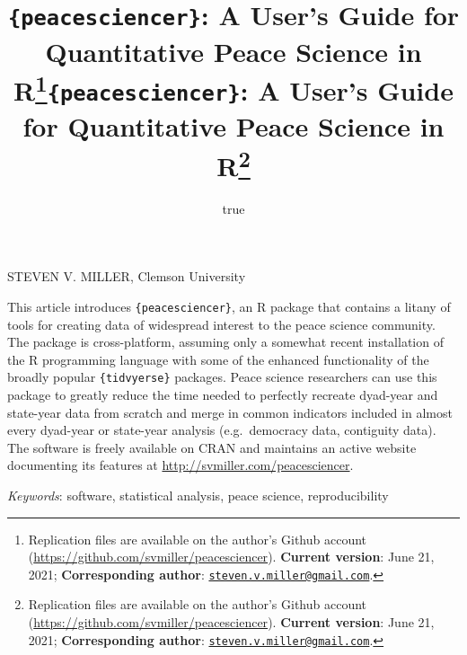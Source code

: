 \documentclass[
  11pt,
]{article}
\title{\texttt{\{peacesciencer\}}: A User's Guide for Quantitative Peace Science in R\thanks{Replication files are available on the author's Github account (\url{https://github.com/svmiller/peacesciencer}). \textbf{Current version}: June 21, 2021; \textbf{Corresponding author}: \href{mailto:steven.v.miller@gmail.com}{\nolinkurl{steven.v.miller@gmail.com}}.}}
\author{true}
\date{}
\title{\texttt{\{peacesciencer\}}: A User's Guide for Quantitative Peace Science in R\thanks{Replication files are available on the author's Github account (\url{https://github.com/svmiller/peacesciencer}). \textbf{Current version}: June 21, 2021; \textbf{Corresponding author}: \href{mailto:steven.v.miller@gmail.com}{\nolinkurl{steven.v.miller@gmail.com}}.}  }
\date{}
\renewenvironment{abstract}
 {{%
    \setlength{\leftmargin}{0mm}
    \setlength{\rightmargin}{\leftmargin}%
  }%
  \relax}
 {\endlist}
\begin{document}



{%
\setlength{\parindent}{0pt}
\thispagestyle{plain}
{%
\maketitle  %

}




{
   \vskip 13.5pt\relax \normalsize\fontsize{11}{12}
   \MakeUppercase{Steven V. Miller}, \small{Clemson University}   

}

}








\begin{abstract}


    \vskip 8.5pt %

\noindent \small{This article introduces \texttt{\{peacesciencer\}}, an R package that contains a litany of tools for creating data of widespread interest to the peace science community. The package is cross-platform, assuming only a somewhat recent installation of the R programming language with some of the enhanced functionality of the broadly popular \texttt{\{tidvyerse\}} packages. Peace science researchers can use this package to greatly reduce the time needed to perfectly recreate dyad-year and state-year data from scratch and merge in common indicators included in almost every dyad-year or state-year analysis (e.g.~democracy data, contiguity data). The software is freely available on CRAN and maintains an active website documenting its features at \url{http://svmiller.com/peacesciencer}.}


\vskip 8.5pt \noindent \emph{Keywords}: software, statistical analysis, peace science, reproducibility \par




\end{abstract}
\end{document}
